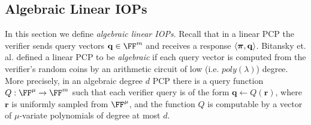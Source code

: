 

\subsection{Algebraic Linear IOPs} 

In this section we define \emph{algebraic linear IOPs}. Recall that in a linear PCP the verifier sends query vectors $\mathbf{q} \in \FF^m$ and receives a response $\langle \boldsymbol{\pi}, \mathbf{q} \rangle$. Bitansky et. al. \cite{TCC:BCIOP13} defined a linear PCP to be \emph{algebraic} if each query vector is computed from the verifier's random coins by an arithmetic circuit of low (i.e. $poly(\lambda)$) degree. More precisely, in an algebraic degree $d$ PCP there is a query function $Q: \FF^\mu \rightarrow \FF^m$ such that each verifier query is of the form $\mathbf{q} \leftarrow Q(\mathbf{r})$, where $\mathbf{r}$ is uniformly sampled from $\FF^\mu$, and the function $Q$ is computable by a vector of $\mu$-variate polynomials of degree at most $d$. 


